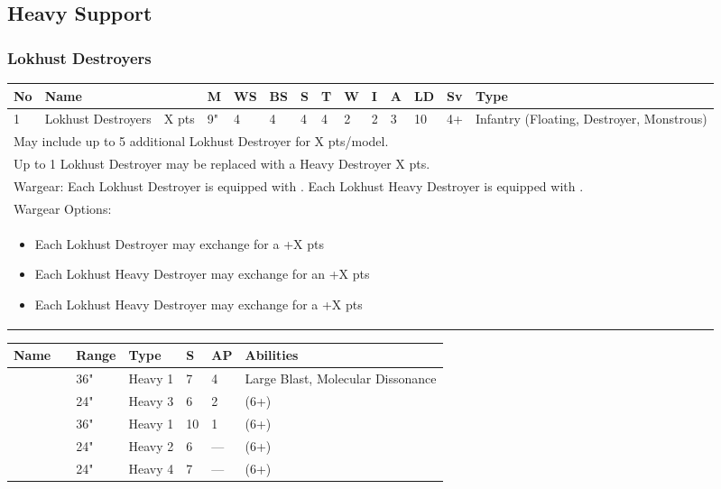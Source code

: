 \subsection{Heavy Support}

\subsubsection{Lokhust Destroyers}
 
\noindent
\begin{tabular}{||m{10pt} m{95pt} m{30pt} m{11pt} m{11pt} m{11pt} m{11pt} m{11pt} m{11pt} m{11pt} m{11pt} m{11pt} m{11pt} m{125pt}||}
	\hline
	No & Name & & M & WS & BS & S & T & W & I & A & LD & Sv & Type \\
	\hline
	1 & Lokhust Destroyers & X pts & 9" & 4 & 4 & 4 & 4 & 2 & 2 & 3 & 10 & 4+ & Infantry (Floating, Destroyer, Monstrous) \\
	\hline
	\hline
	\multicolumn{14}{||Z{532 pt}||}{May include up to 5 additional Lokhust Destroyer for X pts/model.} \\	
	\multicolumn{14}{||Z{532 pt}||}{Up to 1 Lokhust Destroyer may be replaced with a Heavy Destroyer X pts.} \\	
	\hline
	\hline
	\multicolumn{14}{||Z{532 pt}||}{Wargear: Each Lokhust Destroyer is equipped with \quickref{Gauss Cannon}. Each Lokhust Heavy Destroyer is equipped with \quickref{Gauss Destructor}.} \\
	\multicolumn{14}{||Z{532 pt}||}{Wargear Options:} \\	\multicolumn{14}{||Z{532 pt}||}{\begin{itemize}
			\item Each Lokhust Destroyer may exchange \quickref{Gauss Cannon} for a \quickref{Tesla Cannon} \hrulefill +X pts
			\item Each Lokhust Heavy Destroyer may exchange \quickref{Gauss Destructor} for an \quickref{Enmitic Exterminator} \hrulefill +X pts
			\item Each Lokhust Heavy Destroyer may exchange \quickref{Gauss Destructor} for a \quickref{Tesla Destructor} \hrulefill +X pts
	\end{itemize}} \\
	\hline
\end{tabular}

\noindent
\begin{tabular}{||m{110pt} m{30pt} m{31pt} m{55pt} m{12pt} m{12pt} m{210pt}||}
	\hline
	Name & & Range & Type & S & AP & Abilities \\
	\hline
	\quickref{Enmitic Exterminator} &  & 36" & Heavy 1 & 7 & 4 & Large Blast, Molecular Dissonance \\
	\quickref{Gauss Cannon} &  & 24" & Heavy 3 & 6 & 2 & \quickref{Gauss} (6+) \\
	\quickref{Gauss Destructor} &  & 36" & Heavy 1 & 10 & 1 &  \quickref{Gauss} (6+) \\
	\quickref{Tesla Cannon} &  & 24" & Heavy 2 & 6 & — & \quickref{Tesla} (6+) \\
	\quickref{Tesla Destructor} &  & 24" & Heavy 4 & 7 & — &  \quickref{Tesla} (6+) \\
	\hline
\end{tabular}

